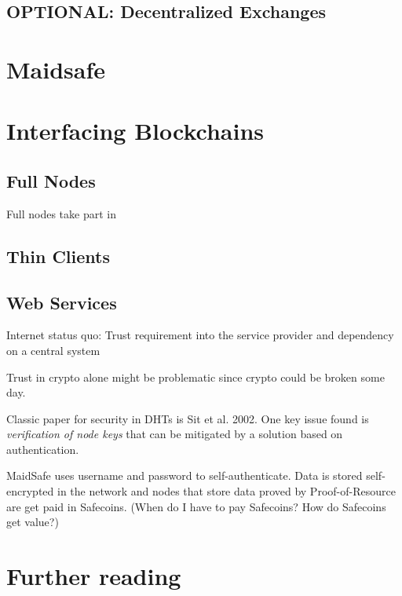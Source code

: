 \subsection{OPTIONAL: Decentralized Exchanges}

\section{Maidsafe}

\section{Interfacing Blockchains}

\subsection{Full Nodes}
Full nodes take part in 

\subsection{Thin Clients}

\subsection{Web Services}

Internet status quo: Trust requirement into the service provider and dependency on a central system

Trust in crypto alone might be problematic since crypto could be broken some day.

Classic paper for security in DHTs is Sit et al. 2002. One key issue found is \emph{verification of node keys} that can be mitigated by a solution based on authentication.

MaidSafe uses username and password to self-authenticate. Data is stored self-encrypted in the network and nodes that store data proved by Proof-of-Resource are get paid in Safecoins. (When do I have to pay Safecoins? How do Safecoins get value?) 

\section{Further reading}
\cite{Bonneau2015,Tschorsch:2015:464}